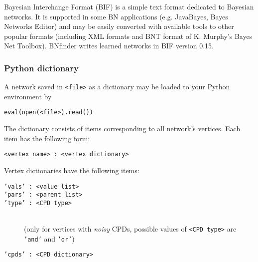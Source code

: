  Bayesian Interchange Format (BIF) is a simple text format dedicated to Bayesian networks.
 It is supported in some BN applications (e.g. JavaBayes, Bayes Networks Editor)
 and may be easily converted with available tools to other popular formats 
 (including XML formats and BNT format of K. Murphy's Bayes Net Toolbox).
 BNfinder writes learned networks in BIF version 0.15.
 
\subsubsection{Python dictionary}

A network saved in \texttt{<file>} as a dictionary may be loaded to your Python environment by
\begin{verbatim}
eval(open(<file>).read())
\end{verbatim}

The dictionary consists of items corresponding to all network's vertices.
Each item has the following form:
\begin{verbatim}
<vertex name> : <vertex dictionary>
\end{verbatim}

Vertex dictionaries have the following items:
\begin{description}
\item[\texttt{'vals' : <value list>}]
\item[\texttt{'pars' : <parent list>}]
\item[\texttt{'type' : <CPD type>}]~\\
 (only for vertices with \emph{noisy} CPDs, possible values of \texttt{<CPD type>} are \texttt{'and'} and \texttt{'or'})
\item[\texttt{'cpds' : <CPD dictionary>}]
\end{description}

